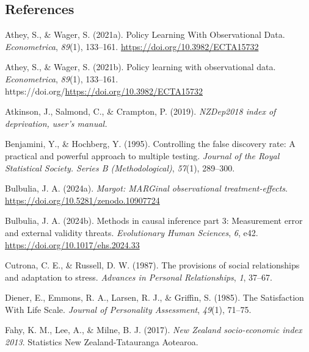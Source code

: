 \documentclass[
  single column]{article}
\newlength{\cslhangindent}
\newenvironment{CSLReferences}[2] %
 {\begin{list}{}{%
  \setlength{\itemindent}{0pt}
  \setlength{\leftmargin}{0pt}
  \setlength{\parsep}{0pt}
  \ifodd #1
   \setlength{\leftmargin}{\cslhangindent}
   \setlength{\itemindent}{-1\cslhangindent}
  \fi
  \setlength{\itemsep}{#2\baselineskip}}}
 {\end{list}}
\begin{document}
\newpage{}

\subsection*{References}\label{references}

\label{refs}
\begin{CSLReferences}{1}{0}
Athey, S., \& Wager, S. (2021a). Policy Learning With Observational
Data. \emph{Econometrica}, \emph{89}(1), 133--161.
\url{https://doi.org/10.3982/ECTA15732}

Athey, S., \& Wager, S. (2021b). Policy learning with observational
data. \emph{Econometrica}, \emph{89}(1), 133--161.
https://doi.org/\url{https://doi.org/10.3982/ECTA15732}

Atkinson, J., Salmond, C., \& Crampton, P. (2019). \emph{NZDep2018 index
of deprivation, user{'}s manual.}

Benjamini, Y., \& Hochberg, Y. (1995). Controlling the false discovery
rate: A practical and powerful approach to multiple testing.
\emph{Journal of the Royal Statistical Society. Series B
(Methodological)}, \emph{57}(1), 289--300.

Bulbulia, J. A. (2024a). \emph{Margot: MARGinal observational
treatment-effects}. \url{https://doi.org/10.5281/zenodo.10907724}

Bulbulia, J. A. (2024b). Methods in causal inference part 3: Measurement
error and external validity threats. \emph{Evolutionary Human Sciences},
\emph{6}, e42. \url{https://doi.org/10.1017/ehs.2024.33}

Cutrona, C. E., \& Russell, D. W. (1987). The provisions of social
relationships and adaptation to stress. \emph{Advances in Personal
Relationships}, \emph{1}, 37--67.

Diener, E., Emmons, R. A., Larsen, R. J., \& Griffin, S. (1985). The
Satisfaction With Life Scale. \emph{Journal of Personality Assessment},
\emph{49}(1), 71--75.

Fahy, K. M., Lee, A., \& Milne, B. J. (2017). \emph{{N}ew {Z}ealand
socio-economic index 2013}. Statistics New Zealand-Tatauranga Aotearoa.


\end{CSLReferences}
\end{document}

